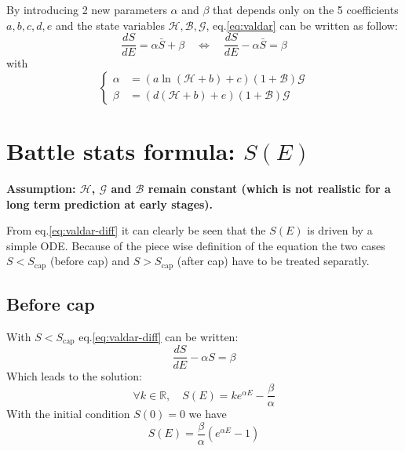 \documentclass[12pt]{article}
\def\happy{\mathcal{H}}
\def\gym{\mathcal{G}}
\def\bonus{\mathcal{B}}
\def\Sc{S_\text{cap}}
\begin{document}
\par By introducing 2 new parameters $\alpha$ and $\beta$ that depends only on the 5 coefficients $a, b, c, d, e$ and the state variables $\happy, \bonus, \gym$, eq.\eqref{eq:valdar} can be written as follow:
\begin{equation}
    \frac{dS}{dE} = \alpha \bar{S} + \beta \quad \Leftrightarrow \quad \frac{dS}{dE} - \alpha \bar{S} = \beta
    \label{eq:valdar-diff}
\end{equation}
with
\begin{equation}
    \left\{\begin{aligned}
        \alpha &= (a\ln(\happy+b)+c)(1+\bonus)\gym\\
        \beta &= (d(\happy+b) +e)(1+\bonus)\gym
    \end{aligned}\right.
\end{equation}

\section{Battle stats formula: $S(E)$}
\par {\color{myred}\bf Assumption: $\happy$, $\gym$ and $\bonus$ remain constant (which is not realistic for a long term prediction at early stages).}

\par From eq.\eqref{eq:valdar-diff} it can clearly be seen that the $S(E)$ is driven by a simple ODE. Because of the piece wise definition of the equation the two cases $S<\Sc$ (before cap) and $S>\Sc$ (after cap) have to be treated separatly.

\subsection{Before cap}
With $S<\Sc$ eq.\eqref{eq:valdar-diff} can be written:
\begin{equation}
    \frac{dS}{dE} -\alpha S = \beta
\end{equation}
Which leads to the solution:
\begin{equation}
    \forall k \in \mathbb{R},\quad S(E) = ke^{\alpha E} - \frac{\beta}{\alpha}
    \label{eq:bs-bc-diff-k}
\end{equation}
With the initial condition $S(0)=0$ we have
\begin{equation}
    S(E) = \frac{\beta}{\alpha}\left(e^{\alpha E} - 1\right)
    \label{eq:bs-bc-diff}
\end{equation}
\end{document}
